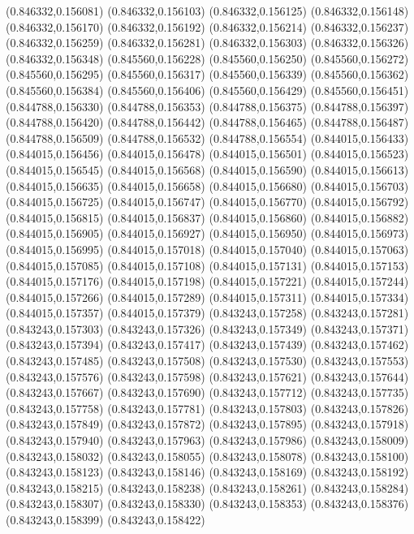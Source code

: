 (0.846332,0.156081)
(0.846332,0.156103)
(0.846332,0.156125)
(0.846332,0.156148)
(0.846332,0.156170)
(0.846332,0.156192)
(0.846332,0.156214)
(0.846332,0.156237)
(0.846332,0.156259)
(0.846332,0.156281)
(0.846332,0.156303)
(0.846332,0.156326)
(0.846332,0.156348)
(0.845560,0.156228)
(0.845560,0.156250)
(0.845560,0.156272)
(0.845560,0.156295)
(0.845560,0.156317)
(0.845560,0.156339)
(0.845560,0.156362)
(0.845560,0.156384)
(0.845560,0.156406)
(0.845560,0.156429)
(0.845560,0.156451)
(0.844788,0.156330)
(0.844788,0.156353)
(0.844788,0.156375)
(0.844788,0.156397)
(0.844788,0.156420)
(0.844788,0.156442)
(0.844788,0.156465)
(0.844788,0.156487)
(0.844788,0.156509)
(0.844788,0.156532)
(0.844788,0.156554)
(0.844015,0.156433)
(0.844015,0.156456)
(0.844015,0.156478)
(0.844015,0.156501)
(0.844015,0.156523)
(0.844015,0.156545)
(0.844015,0.156568)
(0.844015,0.156590)
(0.844015,0.156613)
(0.844015,0.156635)
(0.844015,0.156658)
(0.844015,0.156680)
(0.844015,0.156703)
(0.844015,0.156725)
(0.844015,0.156747)
(0.844015,0.156770)
(0.844015,0.156792)
(0.844015,0.156815)
(0.844015,0.156837)
(0.844015,0.156860)
(0.844015,0.156882)
(0.844015,0.156905)
(0.844015,0.156927)
(0.844015,0.156950)
(0.844015,0.156973)
(0.844015,0.156995)
(0.844015,0.157018)
(0.844015,0.157040)
(0.844015,0.157063)
(0.844015,0.157085)
(0.844015,0.157108)
(0.844015,0.157131)
(0.844015,0.157153)
(0.844015,0.157176)
(0.844015,0.157198)
(0.844015,0.157221)
(0.844015,0.157244)
(0.844015,0.157266)
(0.844015,0.157289)
(0.844015,0.157311)
(0.844015,0.157334)
(0.844015,0.157357)
(0.844015,0.157379)
(0.843243,0.157258)
(0.843243,0.157281)
(0.843243,0.157303)
(0.843243,0.157326)
(0.843243,0.157349)
(0.843243,0.157371)
(0.843243,0.157394)
(0.843243,0.157417)
(0.843243,0.157439)
(0.843243,0.157462)
(0.843243,0.157485)
(0.843243,0.157508)
(0.843243,0.157530)
(0.843243,0.157553)
(0.843243,0.157576)
(0.843243,0.157598)
(0.843243,0.157621)
(0.843243,0.157644)
(0.843243,0.157667)
(0.843243,0.157690)
(0.843243,0.157712)
(0.843243,0.157735)
(0.843243,0.157758)
(0.843243,0.157781)
(0.843243,0.157803)
(0.843243,0.157826)
(0.843243,0.157849)
(0.843243,0.157872)
(0.843243,0.157895)
(0.843243,0.157918)
(0.843243,0.157940)
(0.843243,0.157963)
(0.843243,0.157986)
(0.843243,0.158009)
(0.843243,0.158032)
(0.843243,0.158055)
(0.843243,0.158078)
(0.843243,0.158100)
(0.843243,0.158123)
(0.843243,0.158146)
(0.843243,0.158169)
(0.843243,0.158192)
(0.843243,0.158215)
(0.843243,0.158238)
(0.843243,0.158261)
(0.843243,0.158284)
(0.843243,0.158307)
(0.843243,0.158330)
(0.843243,0.158353)
(0.843243,0.158376)
(0.843243,0.158399)
(0.843243,0.158422)
